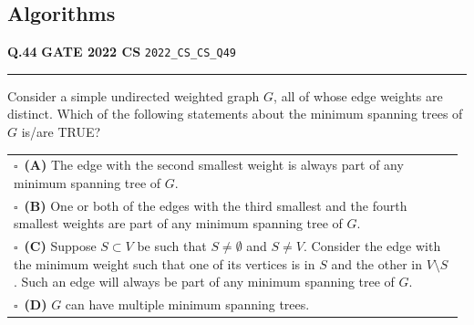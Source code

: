 \documentclass[a4paper,10pt]{article}
\begin{document}
\subsection*{Algorithms}
\vspace{-4pt}
\noindent
\begin{tcolorbox}[
    blanker,
    sidebyside,
    sidebyside align=top,
    lefthand width=0.55\textwidth,
    top=4pt, bottom=4pt, left=0pt, right=0pt,
    middle=16pt,
    underlay={
        \draw[dashed, black!80, line width=0.8pt, dash pattern=on 4pt off 3pt]
            ([xshift=0.55\textwidth+8pt]frame.north west) --
            ([xshift=0.55\textwidth+8pt]frame.south west);
    }
]
\textbf{Q.44}  \hfill {\footnotesize\textbf{GATE 2022 CS} \quad \tiny\texttt{2022\_CS\_CS\_Q49}}
\vspace{2pt}\hrule height 0.3pt\vspace{4pt}

Consider a simple undirected weighted graph $G$, all of whose edge weights are distinct. Which of the following statements about the minimum spanning trees of $G$ is/are TRUE?

\par\vspace{6pt}\noindent
\begin{tabular}{@{}p{0.98\linewidth}@{}}
$\square$\ \textbf{(A)} The edge with the second smallest weight is always part of any minimum spanning tree of $G$. \\
\addlinespace[3pt]
$\square$\ \textbf{(B)} One or both of the edges with the third smallest and the fourth smallest weights are part of any minimum spanning tree of $G$. \\
\addlinespace[3pt]
$\square$\ \textbf{(C)} Suppose $S \subset V$ be such that $S \neq \emptyset$ and $S \neq V$. Consider the edge with the minimum weight such that one of its vertices is in $S$ and the other in $V \setminus S$. Such an edge will always be part of any minimum spanning tree of $G$. \\
\addlinespace[3pt]
$\square$\ \textbf{(D)} $G$ can have multiple minimum spanning trees.
\end{tabular}

\tcblower


\end{tcolorbox}
\end{document}
